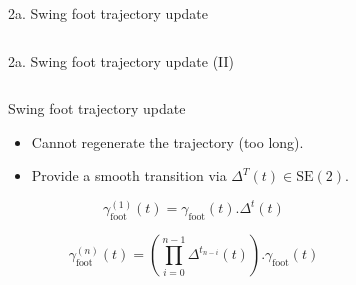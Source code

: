\documentclass[hyperref={pdfpagelabels=false}]{beamer}
\begin{document}
\begin{frame}{2a. Swing foot trajectory update}
\begin{columns}[c]
\begin{column}{0.5\textwidth}
\begin{center}
      \end{center}
    \end{column}
  \end{columns}
\end{frame}

\begin{frame}{2a. Swing foot trajectory update (II)}

  \begin{columns}[c]
    \begin{column}{0.5\textwidth}

      \begin{block}{Swing foot trajectory update}
        \begin{itemize}
          \item Cannot regenerate the trajectory (too long).
          \item Provide a smooth transition via $\Delta^T (t) \in \text{SE}(2)$.
        \end{itemize}

        \begin{equation}
          \gamma_{\text{foot}}^{(1)}(t) = \gamma_{\text{foot}}(t) . \Delta^t(t)
        \end{equation}

        \begin{equation}
          \gamma_{\text{foot}}^{(n)}(t) = ( \prod_{i=0}^{n-1}\Delta^{t_{n-i}}(t) ) . \gamma_{\text{foot}}(t)
        \end{equation}
      \end{block}
    \end{column}

    \begin{column}{0.5\textwidth}

\begin{figure}[ht!]
  \begin{center}

\end{center}
\end{figure}
\end{column}
\end{columns}
\end{frame}
\end{document}
